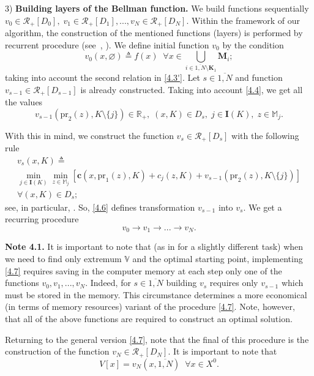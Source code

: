\documentclass[10pt]{article}
\begin{document}
3) {\bf Building layers of the Bellman function.}
We build functions sequentially
$v_0 \in \mathcal{R}_+[D_0],\;v_1 \in \mathcal{R}_+[D_1],...,v_N \in \mathcal{R}_+[D_N]$.
Within the framework of our algorithm, the construction of the mentioned functions
(layers)
is performed by  recurrent procedure
(see~\cite[$\S$4.9]{14}, \cite{18}).
We define
initial
function $ v_0 $ by the condition
\begin{equation}\label{4.5}
  v_0(x,\varnothing) {\triangleq} f(x)\;\;
  \forall{x} \in \bigcup\limits_{i \in \overline{1,N} \setminus \mathbf{K}_1} \mathbf{\mathbf{M}}_i;
\end{equation}
taking into account the second relation in \eqref {4.3'}.
Let $s \in \overline{1,N}$
and function
$v_{s-1} \in \mathcal{R}_+[D_{s-1}]$
is already constructed.
Taking into account
\eqref{4.4},
we get all the values
$$
  v_{s-1}(\mathrm{pr}_2(z),K \setminus \{j\}) \in \mathbb{R}_+,\;
  (x,K) \in D_s,\;j \in \mathbf{I}(K),\;z \in \mathbb{M}_j.
$$

With this in mind,
we construct the function
$v_s \in \mathcal{R}_+[D_s]$
with the following rule
\begin{multline}
  \label{4.6}
  v_s(x,K) {\triangleq} \\
  \min\limits_{j \in \mathbf{I}(K)} \min\limits_{z \in \mathbb{M}_j}
  [\mathbf{c}(x,\mathrm{pr}_1(z),K) + c_j(z,K) + v_{s-1}(\mathrm{pr}_2(z),K \setminus \{j\})] \\
  \forall{(x,K)} \in D_s;
\end{multline}
see, in particular,
\cite[(4.3.13)]{4}.
So, \eqref{4.6}
defines transformation
$v_{s-1}$ into $v_s.$
We get a recurring procedure
\begin{equation}\label{4.7}
  v_0 \longrightarrow v_1 \longrightarrow ... \longrightarrow v_N.
\end{equation}

{\bf Note 4.1.}
It is important to note that
(as in \cite {22} for a slightly different task)
when we need to find
only extremum
$ \mathbb V $
and the optimal starting point,
implementing \eqref {4.7}
requires saving in the computer memory
at each step
only one of the functions
$v_0,v_1,...,v_N$.
Indeed,
for
$s \in \overline{1,N}$
building $v_s$
requires only $v_{s-1}$
which must be stored in the memory.
This circumstance determines a more economical
(in terms of memory resources)
variant of the procedure \eqref {4.7}.
Note, however,
that all of the above functions are required to construct an optimal solution.

Returning to the general version \eqref {4.7},
note that the final of this procedure is the construction of the function
$v_N \in \mathcal{R}_+[D_N]$.
It is important to note that
\begin{equation}\label{4.8}
  V[x] = v_N(x,\overline{1,N})\;\;\forall{x} \in X^0.
\end{equation}
\end{document}
